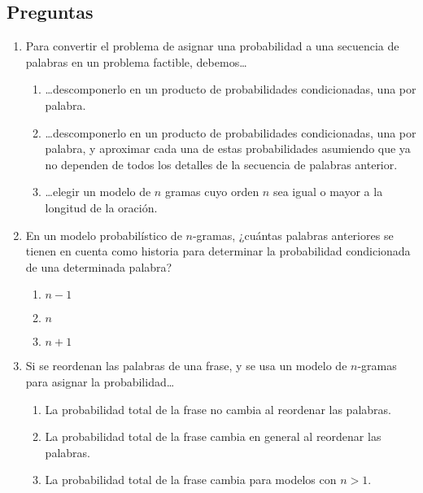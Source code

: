 \documentclass[12pt,a4paper]{article}
\begin{document}
\subsection*{Preguntas}
\begin{enumerate}


\item Para convertir el problema de asignar una probabilidad a una secuencia de palabras en un problema factible, debemos\ldots
  \begin{enumerate}
  \item \ldots descomponerlo en un producto de probabilidades
    condicionadas, una por palabra.
  \item \ldots descomponerlo en un producto de probabilidades
    condicionadas, una por palabra, y aproximar cada una de estas
    probabilidades asumiendo que ya no dependen de todos los detalles
    de la secuencia de palabras anterior.
  \item \ldots elegir un modelo de \(n\) gramas cuyo orden \(n\) sea igual o mayor a la longitud de la oración.

  \end{enumerate}
\item En un modelo probabilístico de \(n\)-gramas,
  ¿cuántas palabras anteriores se tienen en cuenta como historia para
  determinar la probabilidad condicionada de una determinada palabra?
  \begin{enumerate}
  \item \(n-1\)
  \item \(n\)
  \item \(n+1\)
  \end{enumerate}

\item Si se reordenan las palabras de una frase, y se usa un modelo de \(n\)-gramas para asignar la probabilidad\ldots
  \begin{enumerate}
  \item La probabilidad total de la frase no cambia al reordenar las palabras.
  \item La probabilidad total de la frase cambia en general al reordenar las palabras.
  \item La probabilidad total de la frase cambia para modelos con \(n>1\).
  \end{enumerate}


\end{enumerate}
\end{document}
